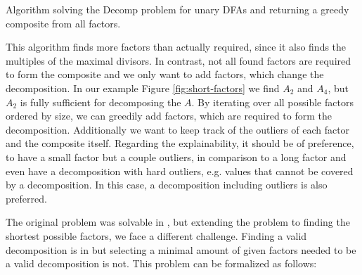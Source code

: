 \begin{algorithm}[H]
	\label{algo:composite}
	\DontPrintSemicolon
	
	
	
	
	\caption{Algorithm solving the Decomp problem for unary DFAs and returning a greedy composite from all factors.}
\end{algorithm}

This algorithm finds more factors than actually required, since it also finds the multiples of the maximal divisors. In contrast, not all found factors are required to form the composite and we only want to add factors, which change the decomposition. In our example Figure \ref{fig:short-factors} we find $A_2$ and $A_4$, but $A_2$ is fully sufficient for decomposing the \DFA $A$. By iterating over all possible factors ordered by size, we can greedily add factors, which are required to form the decomposition. Additionally we want to keep track of the outliers of each factor and the composite itself. Regarding the explainability, it should be of preference, to have a small factor but a couple outliers, in comparison to a long factor and even have a decomposition with hard outliers, e.g. values that cannot be covered by a decomposition. In this case, a decomposition including outliers is also preferred.

The original problem was solvable in \LogSpace, but extending the problem to finding the shortest possible factors, we face a different challenge. Finding a valid decomposition is in \LogSpace but selecting a minimal amount of given factors needed to be a valid decomposition is not. This problem can be formalized as follows:

